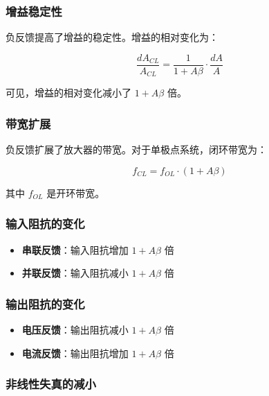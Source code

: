 \subsubsection{增益稳定性}

负反馈提高了增益的稳定性。增益的相对变化为：

\begin{equation}
\frac{dA_{CL}}{A_{CL}} = \frac{1}{1 + A\beta} \cdot \frac{dA}{A} \label{eq:gain-stability}
\end{equation}

可见，增益的相对变化减小了 $1 + A\beta$ 倍。

\subsubsection{带宽扩展}

负反馈扩展了放大器的带宽。对于单极点系统，闭环带宽为：

\begin{equation}
f_{CL} = f_{OL} \cdot (1 + A\beta) \label{eq:bandwidth-extension}
\end{equation}

其中 $f_{OL}$ 是开环带宽。

\subsubsection{输入阻抗的变化}

\begin{itemize}
  \item \textbf{串联反馈}：输入阻抗增加 $1 + A\beta$ 倍
  \item \textbf{并联反馈}：输入阻抗减小 $1 + A\beta$ 倍
\end{itemize}

\subsubsection{输出阻抗的变化}

\begin{itemize}
  \item \textbf{电压反馈}：输出阻抗减小 $1 + A\beta$ 倍
  \item \textbf{电流反馈}：输出阻抗增加 $1 + A\beta$ 倍
\end{itemize}

\subsubsection{非线性失真的减小}

